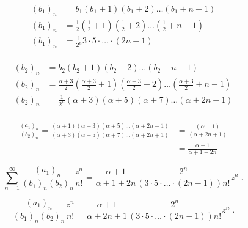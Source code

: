 \documentclass[10pt,a4paper]{article}%
\begin{document}
\begin{equation}
\begin{split}
(b_1)_n &= b_1\left(b_1+1\right)\left(b_1+2\right)\ldots\left(b_1+n-1\right) \\
(b_1)_n &= \frac{1}{2}\left(\frac{1}{2}+1\right)\left(\frac{1}{2}+2\right)\ldots\left(\frac{1}{2}+n-1\right) \\
(b_1)_n &= \frac{1}{2^n} 3\cdot 5\cdot\ldots\cdot \left(2n-1\right) \\
\end{split}
\end{equation}

\begin{equation}
\begin{split}
(b_2)_n &= b_2\left(b_2+1\right)\left(b_2+2\right)\ldots\left(b_2+n-1\right) \\
(b_2)_n &= \frac{\alpha+3}{2}\left(\frac{\alpha+3}{2}+1\right)\left(\frac{\alpha+3}{2}+2\right)\ldots\left(\frac{\alpha+3}{2}+n-1\right) \\
(b_2)_n &= \frac{1}{2^n}\left(\alpha+3\right)\left(\alpha+5\right)\left(\alpha+7\right)\ldots\left(\alpha+2n+1\right) \\
\end{split}
\end{equation}

\begin{equation}
\begin{split}
\frac{(a_1)_n}{(b_2)_n} = \frac{\left(\alpha+1\right)\left(\alpha+3\right)\left(\alpha+5\right)\ldots\left(\alpha+2n-1\right)}{\left(\alpha+3\right)\left(\alpha+5\right)\left(\alpha+7\right)\ldots\left(\alpha+2n+1\right)}
&= \frac{(\alpha+1)}{(\alpha+2n+1)} \\
&= \frac{\alpha+1}{\alpha+1+2n} 
\end{split}
\end{equation}

\begin{equation}
\sum_{n=1}^{\infty} \frac{(a_1)_n}{(b_1)_n(b_2)_n}
   \frac{z^n}{n!}
   = \frac{\alpha+1}{\alpha+1+2n} \frac{2^n}{\left(3\cdot 5\cdot\ldots\cdot \left(2n-1\right)\right)n!} z^n
  \;.
\end{equation}

\begin{equation}
\frac{(a_1)_n}{(b_1)_n(b_2)_n}
   \frac{z^n}{n!}
   = \frac{\alpha+1}{\alpha+2n+1} \frac{2^n}{\left(3\cdot 5\cdot\ldots\cdot \left(2n-1\right)\right)n!} z^n
  \;.
\end{equation}
\end{document}
